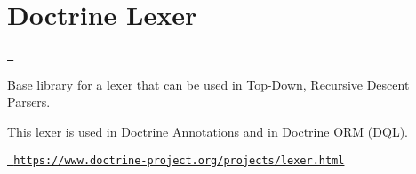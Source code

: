 \chapter{Doctrine Lexer}
\hypertarget{md_vendor_2doctrine_2lexer_2_r_e_a_d_m_e}{}\label{md_vendor_2doctrine_2lexer_2_r_e_a_d_m_e}
\label{md_vendor_2doctrine_2lexer_2_r_e_a_d_m_e_autotoc_md86}%
%
 \href{https://github.com/doctrine/lexer/actions}{\texttt{ }}

Base library for a lexer that can be used in Top-\/\+Down, Recursive Descent Parsers.

This lexer is used in Doctrine Annotations and in Doctrine ORM (DQL).

\href{https://www.doctrine-project.org/projects/lexer.html}{\texttt{ https\+://www.\+doctrine-\/project.\+org/projects/lexer.\+html}} 